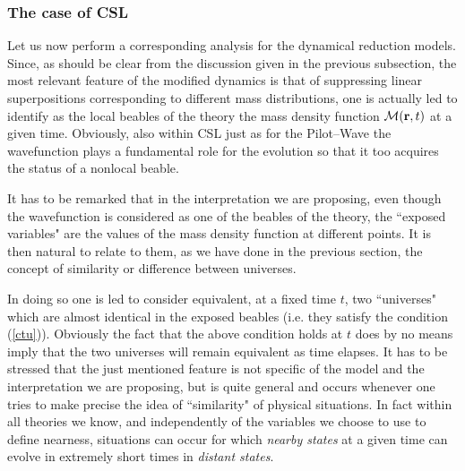 \documentclass[12pt]{article}
\begin{document}
\subsubsection{The case of CSL} \label{sec1252}

Let us now perform a corresponding analysis for the dynamical
reduction models. Since, as should be clear from the discussion
given in the previous subsection, the most relevant feature of the
modified dynamics is that of suppressing linear superpositions
corresponding to different mass distributions, one is actually led
to identify as the local beables of the theory the mass density
function ${\mathcal M}({\bf r},t)$ at a given time. Obviously,
also within CSL just as for the Pilot--Wave the wavefunction plays
a fundamental role for the evolution so that it too acquires the
status of a nonlocal beable.

It has to be remarked that in the interpretation we are proposing,
even though the wavefunction is considered as one of the beables
of the theory, the ``exposed variables" are the values of the mass
density function at different points. It is then natural to relate
to them, as we have done in the previous section, the concept of
similarity or difference between universes.

In doing so one is led to consider equivalent, at a fixed time
$t$, two ``universes" which are almost identical in the exposed
beables (i.e. they satisfy the condition (\ref{ctu})). Obviously
the fact that the above condition holds at $t$ does by no means
imply that the two universes will remain equivalent as time
elapses. It has to be stressed that the just mentioned feature is
not specific of  the model and the interpretation we are
proposing, but is quite general and occurs whenever one tries to
make precise the idea of ``similarity" of physical situations. In
fact within all theories we know, and independently of the
variables we choose to use to define nearness, situations can
occur for which {\it nearby states} at a given time can evolve in
extremely short times in {\it distant states}.
\end{document}
